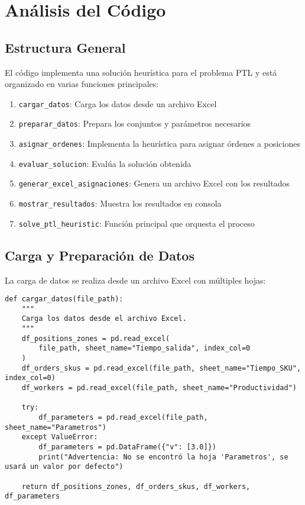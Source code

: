 \documentclass{hw-template}
\begin{document}
\section{Análisis del Código}

\subsection{Estructura General}

El código implementa una solución heurística para el problema PTL y está organizado en varias funciones principales:

\begin{enumerate}
    \item \texttt{cargar\_datos}: Carga los datos desde un archivo Excel
    \item \texttt{preparar\_datos}: Prepara los conjuntos y parámetros necesarios
    \item \texttt{asignar\_ordenes}: Implementa la heurística para asignar órdenes a posiciones
    \item \texttt{evaluar\_solucion}: Evalúa la solución obtenida
    \item \texttt{generar\_excel\_asignaciones}: Genera un archivo Excel con los resultados
    \item \texttt{mostrar\_resultados}: Muestra los resultados en consola
    \item \texttt{solve\_ptl\_heuristic}: Función principal que orquesta el proceso
\end{enumerate}

\subsection{Carga y Preparación de Datos}

La carga de datos se realiza desde un archivo Excel con múltiples hojas:

\begin{verbatim}
def cargar_datos(file_path):
    """
    Carga los datos desde el archivo Excel.
    """
    df_positions_zones = pd.read_excel(
        file_path, sheet_name="Tiempo_salida", index_col=0
    )
    df_orders_skus = pd.read_excel(file_path, sheet_name="Tiempo_SKU", index_col=0)
    df_workers = pd.read_excel(file_path, sheet_name="Productividad")

    try:
        df_parameters = pd.read_excel(file_path, sheet_name="Parametros")
    except ValueError:
        df_parameters = pd.DataFrame({"v": [3.0]})
        print("Advertencia: No se encontró la hoja 'Parametros', se usará un valor por defecto")

    return df_positions_zones, df_orders_skus, df_workers, df_parameters
\end{verbatim}
\end{document}
